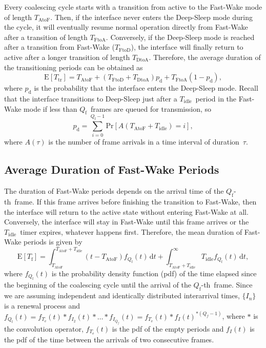 \documentclass[journal,10pt,letterpaper]{IEEEtran}
\begin{document}
Every coalescing cycle starts with a transition from active to the
Fast-Wake mode of length $T_{\mathrm{AtoF}}$. Then, if the interface
never enters the Deep-Sleep mode during the cycle, it will eventually
resume normal operation directly from Fast-Wake after a transition of
length $T_{\mathrm{FtoA}}$. Conversely, if the Deep-Sleep mode is
reached after a transition from Fast-Wake ($T_{\mathrm{FtoD}}$), the
interface will finally return to active after a longer transition of
length $T_{\mathrm{DtoA}}$. Therefore, the average duration of the
transitioning periods can be obtained as
\begin{equation}
  \label{eq:T_trans}
  \mathrm{E}[T_{\mathrm{tr}}] = T_{\mathrm{AtoF}} + (T_{\mathrm{FtoD}} + T_{\mathrm{DtoA}}) p_{\mathrm{d}} + T_{\mathrm{FtoA}} (1-p_{\mathrm{d}}),
\end{equation}
where $p_{\mathrm{d}}$ is the probability that the interface enters
the Deep-Sleep mode. Recall that the interface transitions to
Deep-Sleep just after a $T_{\mathrm{idle}}$~period in the Fast-Wake
mode if less than $Q_{\mathrm{f}}$~frames are queued for transmission,
so
\begin{equation}
  \label{eq:p_deep}
  p_{\mathrm{d}} = \sum_{i=0}^{Q_{\mathrm{f}}-1} \mathrm{Pr}[A(T_{\mathrm{AtoF}} + T_{\mathrm{idle}}) = i],
\end{equation}
where $A(\tau)$ is the number of frame arrivals in a time interval of
duration~$\tau$. 

\subsection{Average Duration of Fast-Wake Periods}
\label{sec:fast}

The duration of Fast-Wake periods depends on the arrival time of the
$Q_{\mathrm{f}}$-th~frame. If this frame arrives before finishing the
transition to Fast-Wake, then the interface will return to the active
state without entering Fast-Wake at all. Conversely, the interface
will stay in Fast-Wake until this frame arrives or the
$T_{\mathrm{idle}}$~timer expires, whatever happens first. Therefore,
the mean duration of Fast-Wake periods is given by
\begin{equation}
    \label{eq:T_fast}
  \mathrm{E}[T_{\mathrm{f}}] =
  \int_{T_{\mathrm{AtoF}}}^{T_{\mathrm{AtoF}}+T_{\mathrm{idle}}} \! (t - T_{\mathrm{AtoF}}) f_{Q_{\mathrm{f}}}(t) \, \mathrm{d}t 
  + \int_{T_{\mathrm{AtoF}}+T_{\mathrm{idle}}}^{\infty} \! T_{\mathrm{idle}} f_{Q_{\mathrm{f}}}(t) \, \mathrm{d}t ,
\end{equation}
where $f_{Q_{\mathrm{f}}}(t)$ is the probability density function
(pdf) of the time elapsed since the beginning of the coalescing cycle
until the arrival of the $Q_{\mathrm{f}}$-th~frame. Since we are
assuming independent and identically distributed interarrival times,
$\{I_n\}$ is a renewal process and $f_{Q_{\mathrm{f}}}(t) =
f_{T_{\mathrm{e}}}(t) \ast f_{I_2}(t) \ast \ldots \ast f_{I_{Q_f}}(t)
= f_{T_{\mathrm{e}}}(t) \ast f_I(t)^{\ast (Q_f-1)}$, where $\ast$ is
the convolution operator, $f_{T_{\mathrm{e}}}(t)$ is the pdf of the
empty periods and $f_I(t)$ is the pdf of the time between the arrivals
of two consecutive frames.
\end{document}
